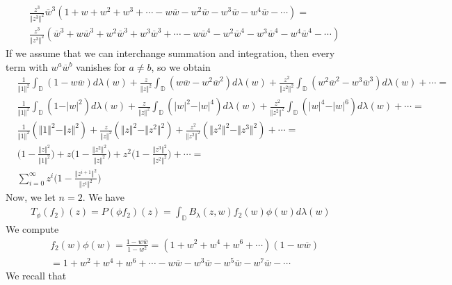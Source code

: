 \documentclass[12pt]{article}
\begin{document}
\begin{align}
&\frac{z^3}{\Vert z^3 \Vert^2} \overline{w}^3 (1 + w + w^2 + w^3 + \cdots - w\overline{w} - w^2 \overline{w} - w^3 \overline{w} - w^4 \overline{w} - \cdots) = \\
& \frac{z^3}{\Vert z^3 \Vert^2} (\overline{w}^3 + w\overline{w}^3 + w^2\overline{w}^3 + w^3\overline{w}^3 + \cdots - w\overline{w}^4 - w^2\overline{w}^4 - w^3 \overline{w}^4 - w^4 \overline{w}^4 -\cdots)
\end{align}
If we assume that we can interchange summation and integration, then every term with $w^a\overline{w}^b$ vanishes for $a \neq b$, so we obtain
\begin{align}
&\frac{1}{\Vert 1 \Vert^2} \int_\mathbb{D} (1 - w\overline{w}) d\lambda(w) + \frac{z}{\Vert z \Vert^2} \int_\mathbb{D} (w \overline{w} - w^2 \overline{w}^2) d\lambda(w) + \frac{z^2}{\Vert z^2 \Vert^2} \int_\mathbb{D} (w^2\overline{w}^2 - w^3 \overline{w}^3) d\lambda(w) + \cdots = \\
& \frac{1}{\Vert 1 \Vert^2} \int_\mathbb{D} (1 - \vert w \vert^2) d\lambda(w) + \frac{z}{\Vert z \Vert^2} \int_\mathbb{D} (\vert w \vert^2 - \vert w \vert^4) d\lambda(w) + \frac{z^2}{\Vert z^2 \Vert^2} \int_\mathbb{D} (\vert w \vert^4 - \vert w \vert^6) d\lambda(w) + \cdots = \\
& \frac{1}{\Vert 1 \Vert^2}(\Vert 1 \Vert^2 - \Vert z \Vert^2) + \frac{z}{\Vert z \Vert^2}(\Vert z \Vert^2 - \Vert z^2 \Vert^2) + \frac{z^2}{\Vert z^2 \Vert^2}(\Vert z^2 \Vert^2 - \Vert z^3 \Vert^2) + \cdots = \\
& \bigg(1 - \frac{\Vert z \Vert^2}{\Vert 1 \Vert^2}\bigg) + z\bigg(1 - \frac{\Vert z^2 \Vert^2}{\Vert z \Vert^2}\bigg) + z^2 \bigg(1 - \frac{\Vert z^3 \Vert^2}{{\Vert z^2 \Vert^2}}\bigg) + \cdots = \\
& \sum_{i=0}^\infty z^i\bigg(1 - \frac{\Vert z^{i+1} \Vert^2}{\Vert z^i \Vert^2}\bigg)
\end{align} Now, we let $n = 2$. We have
\begin{align}
T_\phi(f_2)(z) = P(\phi f_2)(z) = \int_\mathbb{D} B_\lambda(z,w) f_2(w) \phi(w) d\lambda(w)
\end{align} We compute 
\begin{align}
&f_2(w) \phi(w) = \frac{1 - w\overline{w}}{1-w^2} = (1 + w^2 + w^4 + w^6 + \cdots)(1 - w \overline{w}) \\
& = 1 + w^2 + w^4  + w^6 + \cdots - w\overline{w} - w^3 \overline{w} - w^5 \overline{w} - w^7 \overline{w} - \cdots
\end{align} We recall that
\end{document}

